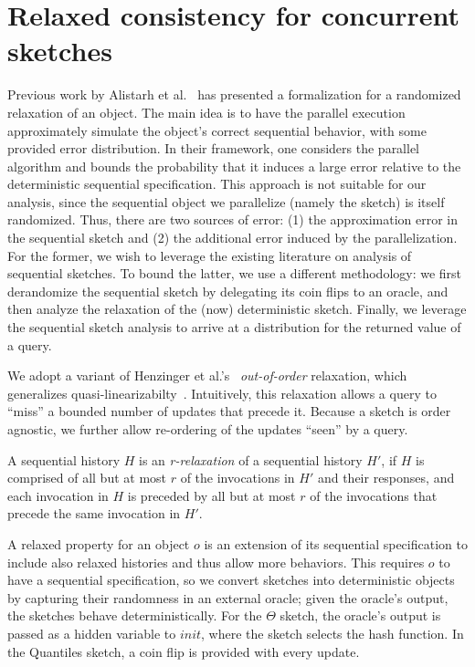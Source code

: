 \section{Relaxed consistency for concurrent sketches}
\label{fc-sec:concurrentSketches}

Previous work by Alistarh et al.~\cite{alistarh2018distributionally} has presented a formalization for a randomized relaxation of an object.
The main idea is to have the parallel execution approximately simulate the object’s correct sequential behavior, with some provided error distribution.
In their framework, one considers the parallel algorithm and bounds the probability that it induces a large error
 relative to the deterministic sequential specification.
This approach is not suitable for our analysis, since the sequential object we parallelize (namely the sketch) is
itself randomized. Thus, there are two sources of error: (1) the approximation error in the sequential sketch and
(2) the additional error induced by the parallelization. For the former, we wish to leverage the
existing literature on analysis of sequential sketches. To bound the latter, we use a different
methodology: we first derandomize the sequential sketch by delegating its coin flips to an oracle,
and then analyze the relaxation of the (now) deterministic sketch. Finally, we leverage the sequential sketch
analysis to arrive at a distribution for the returned value of a query.


We adopt a variant of Henzinger et al.'s~\cite{Henzinger} {\emph{out-of-order}} relaxation,  
which generalizes quasi-linearizabilty~\cite{afek2010quasi}.
Intuitively, this relaxation allows a query to ``miss'' a bounded number of updates that precede it.
Because a sketch is order agnostic, we further allow re-ordering of the updates ``seen'' by a query.

\begin{definition}
  A sequential history $H$ is an \emph{r-relaxation} of a sequential history $H'$,
  if $H$ is comprised of all but at most $r$ of the invocations in $H'$ and their responses,
  and each invocation in $H$ is preceded by all but at most $r$ of the invocations that precede the 
  same invocation in $H'$. 
\end{definition}

A relaxed property for an object $o$ is an extension of its sequential specification to include also
relaxed histories and thus allow more behaviors. This requires $o$ to have a sequential specification, so
we convert sketches into deterministic objects by capturing their randomness in an external oracle; 
given the oracle's output, the sketches behave deterministically.
For the $\Theta$ sketch, the oracle's output is passed as a hidden variable to $init$, where the sketch
selects the hash function. In the Quantiles sketch, a coin flip is provided with every update.


